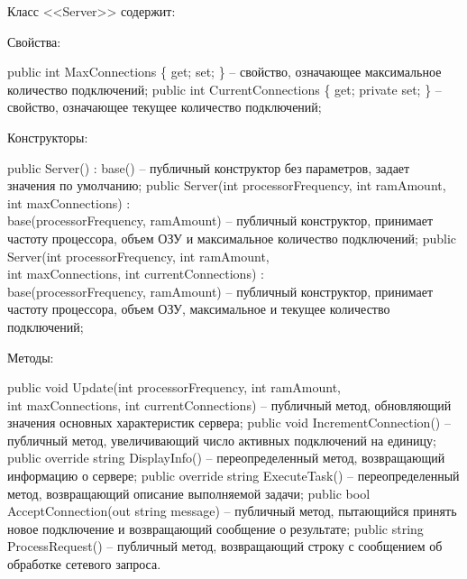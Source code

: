\documentclass[oneside,14pt,a4paper]{extarticle}
\renewcommand{\item}{\itemindent1.25cm\itemold}
\begin{document}
  Класс <<Server>> содержит:
  \begin{itemize}
    \item[--] Свойства:
    \begin{itemize}
      \item[--] public int MaxConnections \{ get; set; \} -- свойство, означающее максимальное количество подключений;
      \item[--] public int CurrentConnections \{ get; private set; \} -- свойство, означающее текущее количество подключений;
    \end{itemize}
    \item[--] Конструкторы:
    \begin{itemize}
      \item[--] public Server() : base() -- публичный конструктор без параметров, задает значения по умолчанию;
      \item[--] public Server(int processorFrequency, int ramAmount, int maxConnections) : \\ 
      base(processorFrequency, ramAmount) -- публичный конструктор, принимает частоту процессора, объем ОЗУ и максимальное количество подключений;
      \item[--] public Server(int processorFrequency, int ramAmount, \\ 
      int maxConnections, int currentConnections) : \\
      base(processorFrequency, ramAmount) -- публичный конструктор, принимает частоту процессора, объем ОЗУ, максимальное и текущее количество подключений;
    \end{itemize}
    \item[--] Методы:
    \begin{itemize}
      \item[--] public void Update(int processorFrequency, int ramAmount, \\
      int maxConnections, int currentConnections) -- публичный метод, обновляющий значения основных характеристик сервера;
      \item[--] public void IncrementConnection() -- публичный метод, увеличивающий число активных подключений на единицу;
      \item[--] public override string DisplayInfo() -- переопределенный метод, возвращающий информацию о сервере;
      \item[--] public override string ExecuteTask() -- переопределенный метод, возвращающий описание выполняемой задачи;
  \item[--] public bool AcceptConnection(out string message) -- публичный метод, пытающийся принять новое подключение и возвращающий сообщение о результате;
  \item[--] public string ProcessRequest() -- публичный метод, возвращающий строку с сообщением об обработке сетевого запроса.
    \end{itemize}
  \end{itemize}
\end{document}
